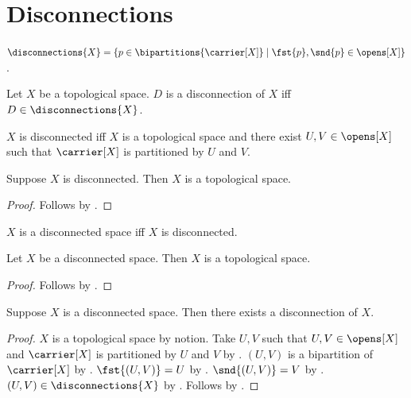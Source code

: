 



\section{Disconnections}

\begin{definition}\label{disconnections}
    $\disconnections{X} = \{ p\in\bipartitions{\carrier[X]} \mid \text{$\fst{p},\snd{p}\in\opens[X]$} \}$.
\end{definition}

\begin{definition}\label{is_a_disconnection}
    Let $X$ be a topological space.
    $D$ is a disconnection of $X$ iff $D\in\disconnections{X}$.
\end{definition}

\begin{definition}\label{disconnected}
    $X$ is disconnected iff $X$ is a topological space and
        there exist $U,V\in\opens[X]$ such that
        $\carrier[X]$ is partitioned by $U$ and $V$.
\end{definition}

\begin{classification}\label{disconnected_is_topological}
    Suppose $X$ is disconnected.
    Then $X$ is a topological space.
\end{classification}
\begin{proof}
    Follows by .
\end{proof}

\begin{abbreviation}\label{disconnected_space}
    $X$ is a disconnected space iff $X$ is disconnected.
\end{abbreviation}

\begin{classification}\label{disconnected_space_is_topological}
    Let $X$ be a disconnected space.
    Then $X$ is a topological space.
\end{classification}
\begin{proof}
    Follows by .
\end{proof}

\begin{proposition}\label{disconnection_from_disconnected}
    Suppose $X$ is a disconnected space.
    Then there exists a disconnection of $X$.
\end{proposition}
\begin{proof}
    $X$ is a topological space by notion.
    Take $U,V$ such that $U,V\in\opens[X]$ and
        $\carrier[X]$ is partitioned by $U$ and $V$
        by .
    $(U,V)$ is a bipartition of $\carrier[X]$ by .
    $\fst{(U,V)}=U$ by .
    $\snd{(U,V)}=V$ by .
    $(U,V)\in\disconnections{X}$ by .
    Follows by .
\end{proof}

